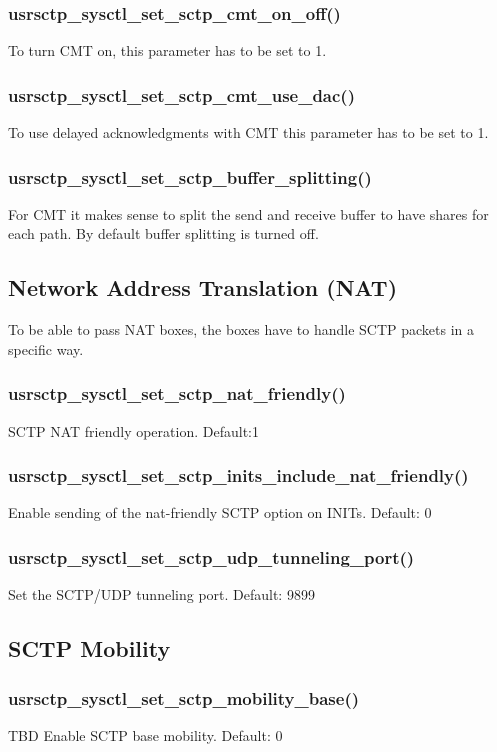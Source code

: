 \documentclass[a4paper]{article}
\begin{document}
\subsubsection{usrsctp\_sysctl\_set\_sctp\_cmt\_on\_off()}
To turn CMT on, this parameter has to be set to 1.

\subsubsection{usrsctp\_sysctl\_set\_sctp\_cmt\_use\_dac()}
To use delayed acknowledgments with CMT this parameter has to be set to 1.

\subsubsection{usrsctp\_sysctl\_set\_sctp\_buffer\_splitting()}
For CMT it makes sense to split the send and receive buffer to have shares for each path. 
By default buffer splitting is turned off.


\subsection{Network Address Translation (NAT)}
To be able to pass NAT boxes, the boxes have to handle SCTP packets in a specific way.

\subsubsection{usrsctp\_sysctl\_set\_sctp\_nat\_friendly()}
SCTP NAT friendly operation. Default:1

\subsubsection{usrsctp\_sysctl\_set\_sctp\_inits\_include\_nat\_friendly()}
Enable sending of the nat-friendly SCTP option on INITs. Default: 0

\subsubsection{usrsctp\_sysctl\_set\_sctp\_udp\_tunneling\_port()}
Set the SCTP/UDP tunneling port. Default: 9899

\subsection{SCTP Mobility}
\subsubsection{usrsctp\_sysctl\_set\_sctp\_mobility\_base()}
TBD
Enable SCTP base mobility. Default: 0
\end{document}
